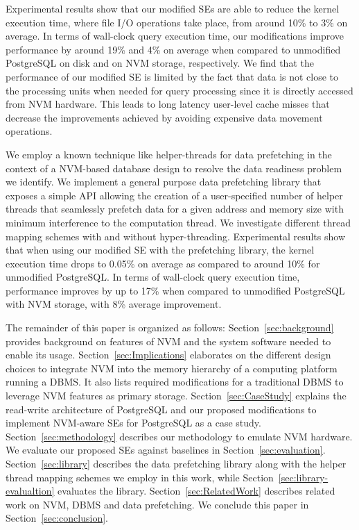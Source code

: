 Experimental results show that our modified SEs are able to reduce the kernel execution time, where file I/O operations take place, from around 10\% to 3\% on average. In terms of wall-clock query execution time, our modifications improve performance by around 19\% and 4\% on average when compared to unmodified PostgreSQL on disk and on NVM storage, respectively. We find that the performance of our modified SE is limited by the fact that data is not close to the processing units when needed for query processing since it is directly accessed from NVM hardware. This leads to long latency user-level cache misses that decrease the improvements achieved by avoiding expensive data movement operations.

We employ a known technique like helper-threads for data prefetching in the context of a NVM-based database design to resolve the data readiness problem we identify. We implement a general purpose data prefetching library that exposes a simple API allowing the creation of a user-specified number of helper threads that seamlessly prefetch data for a given address and memory size with minimum interference to the computation thread. We investigate different thread mapping schemes with and without hyper-threading. Experimental results show that when using our modified SE with the prefetching library, the kernel execution time drops to 0.05\% on average as compared to around 10\% for unmodified PostgreSQL. In terms of wall-clock query execution time, performance improves by up to 17\% when compared to unmodified PostgreSQL with NVM storage, with 8\% average improvement.

The remainder of this paper is organized as follows:
Section~\ref{sec:background} provides background on features of NVM and
the system software needed to enable its usage. Section~\ref{sec:Implications}
elaborates on the different design choices to integrate NVM into the memory hierarchy
of a computing platform running a DBMS. It also lists
required modifications for a traditional DBMS to leverage NVM features as primary storage. Section~\ref{sec:CaseStudy} explains the
read-write architecture of PostgreSQL and our proposed modifications to
implement NVM-aware SEs for PostgreSQL as a case study. Section~\ref{sec:methodology} describes our methodology to emulate NVM hardware. We evaluate our proposed SEs against baselines in Section~\ref{sec:evaluation}. Section~\ref{sec:library} describes the data prefetching library along with the helper thread mapping schemes we employ in this work, while Section~\ref{sec:library-evalualtion} evaluates the library. Section~\ref{sec:RelatedWork} describes related work on NVM, DBMS and data prefetching. We conclude this paper in Section~\ref{sec:conclusion}.
 
  